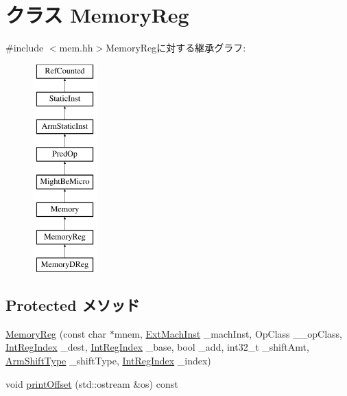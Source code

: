 \hypertarget{classArmISA_1_1MemoryReg}{
\section{クラス MemoryReg}
\label{classArmISA_1_1MemoryReg}
}


{\ttfamily \#include $<$mem.hh$>$}MemoryRegに対する継承グラフ:\begin{figure}[H]
\begin{center}
\leavevmode
\includegraphics[height=8cm]{classArmISA_1_1MemoryReg}
\end{center}
\end{figure}
\subsection*{Protected メソッド}
\begin{DoxyCompactItemize}
\item 
\hyperlink{classArmISA_1_1MemoryReg_a265770bfa42ef839ee5461eff726d53c}{MemoryReg} (const char $\ast$mnem, \hyperlink{classStaticInst_a5605d4fc727eae9e595325c90c0ec108}{ExtMachInst} \_\-machInst, OpClass \_\-\_\-opClass, \hyperlink{namespaceArmISA_ae64680ba9fb526106829d6bf92fc791b}{IntRegIndex} \_\-dest, \hyperlink{namespaceArmISA_ae64680ba9fb526106829d6bf92fc791b}{IntRegIndex} \_\-base, bool \_\-add, int32\_\-t \_\-shiftAmt, \hyperlink{namespaceArmISA_a209d79feaaef0aa2f54ae62e53ee90de}{ArmShiftType} \_\-shiftType, \hyperlink{namespaceArmISA_ae64680ba9fb526106829d6bf92fc791b}{IntRegIndex} \_\-index)
\item 
void \hyperlink{classArmISA_1_1MemoryReg_a7fdadf47668a31b2e7b99f0cc36c5d4f}{printOffset} (std::ostream \&os) const 
\end{DoxyCompactItemize}
